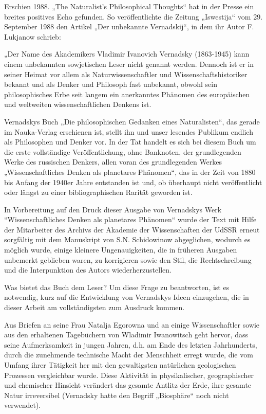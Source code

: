 \documentclass[11pt,a4paper]{article}
\begin{document}
Erschien 1988. „The Naturalist's Philosophical Thoughts“ hat in der Presse ein
breites positives Echo gefunden. So veröffentlichte die Zeitung „Iswestija“
vom 29. September 1988 den Artikel „Der unbekannte Vernadskij“, in dem ihr
Autor F. Lukjanow schrieb:

„Der Name des Akademikers Vladimir Ivanovich Vernadsky (1863-1945) kann einem
unbekannten sowjetischen Leser nicht genannt werden. Dennoch ist er in seiner
Heimat vor allem als Naturwissenschaftler und Wissenschaftshistoriker bekannt
und als Denker und Philosoph fast unbekannt, obwohl sein philosophisches Erbe
seit langem ein anerkanntes Phänomen des europäischen und weltweiten
wissenschaftlichen Denkens ist.

Vernadskys Buch „Die philosophischen Gedanken eines Naturalisten“, das gerade
im Nauka-Verlag erschienen ist, stellt ihn und unser lesendes Publikum endlich
als Philosophen und Denker vor. In der Tat handelt es sich bei diesem Buch um
die erste vollständige Veröffentlichung, ohne Banknoten, der grundlegenden
Werke des russischen Denkers, allen voran des grundlegenden Werkes
„Wissenschaftliches Denken als planetares Phänomen“, das in der Zeit von 1880
bis Anfang der 1940er Jahre entstanden ist und, ob überhaupt nicht
veröffentlicht oder längst zu einer bibliographischen Rarität geworden ist.

In Vorbereitung auf den Druck dieser Ausgabe von Vernadskys Werk
“Wissenschaftliches Denken als planetares Phänomen“ wurde der Text mit Hilfe
der Mitarbeiter des Archivs der Akademie der Wissenschaften der UdSSR erneut
sorgfältig mit dem Manuskript von S.N. Schidowinow abgeglichen, wodurch es
möglich wurde, einige kleinere Ungenauigkeiten, die in früheren Ausgaben
unbemerkt geblieben waren, zu korrigieren sowie den Stil, die Rechtschreibung
und die Interpunktion des Autors wiederherzustellen.

Was bietet das Buch dem Leser? Um diese Frage zu beantworten, ist es
notwendig, kurz auf die Entwicklung von Vernadskys Ideen einzugehen, die in
dieser Arbeit am vollständigsten zum Ausdruck kommen.

Aus Briefen an seine Frau Natalja Egorowna und an einige Wissenschaftler sowie
aus den erhaltenen Tagebüchern von Wladimir Iwanowitsch geht hervor, dass
seine Aufmerksamkeit in jungen Jahren, d.h. am Ende des letzten Jahrhunderts,
durch die zunehmende technische Macht der Menschheit erregt wurde, die vom
Umfang ihrer Tätigkeit her mit den gewaltigsten natürlichen geologischen
Prozessen vergleichbar wurde. Diese Aktivität in physikalischer,
geographischer und chemischer Hinsicht verändert das gesamte Antlitz der Erde,
ihre gesamte Natur irreversibel (Vernadsky hatte den Begriff „Biosphäre“ noch
nicht verwendet).
\end{document}
